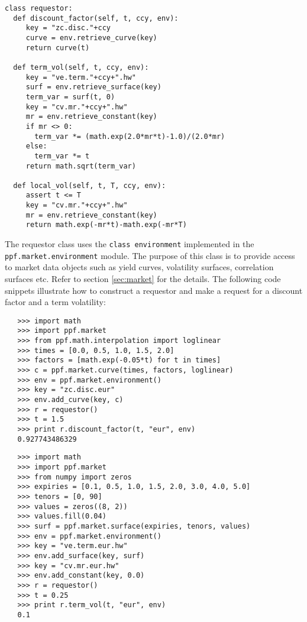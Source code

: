 \begin{verbatim}
class requestor:
  def discount_factor(self, t, ccy, env):
     key = "zc.disc."+ccy
     curve = env.retrieve_curve(key)
     return curve(t)

  def term_vol(self, t, ccy, env):
     key = "ve.term."+ccy+".hw"
     surf = env.retrieve_surface(key)
     term_var = surf(t, 0)
     key = "cv.mr."+ccy+".hw"
     mr = env.retrieve_constant(key)
     if mr <> 0:
       term_var *= (math.exp(2.0*mr*t)-1.0)/(2.0*mr)
     else:
       term_var *= t
     return math.sqrt(term_var)

  def local_vol(self, t, T, ccy, env):
     assert t <= T
     key = "cv.mr."+ccy+".hw"
     mr = env.retrieve_constant(key)
     return math.exp(-mr*t)-math.exp(-mr*T)

\end{verbatim} 

The requestor class uses the \verb|class environment| implemented in
the \\
\verb|ppf.market.environment| module. The purpose of this class is
to provide access to market data objects such as yield curves,
volatility surfaces, correlation surfaces etc. Refer to section
\ref{sec:market} for the details. The following code snippets illustrate
how to construct a requestor and make a request for a discount factor
and a term volatility:

\begin{verbatim}
   >>> import math
   >>> import ppf.market
   >>> from ppf.math.interpolation import loglinear
   >>> times = [0.0, 0.5, 1.0, 1.5, 2.0]
   >>> factors = [math.exp(-0.05*t) for t in times]
   >>> c = ppf.market.curve(times, factors, loglinear)
   >>> env = ppf.market.environment()
   >>> key = "zc.disc.eur"
   >>> env.add_curve(key, c)
   >>> r = requestor()
   >>> t = 1.5
   >>> print r.discount_factor(t, "eur", env)
   0.927743486329
\end{verbatim}

\begin{verbatim}
   >>> import math
   >>> import ppf.market
   >>> from numpy import zeros
   >>> expiries = [0.1, 0.5, 1.0, 1.5, 2.0, 3.0, 4.0, 5.0]
   >>> tenors = [0, 90]
   >>> values = zeros((8, 2))
   >>> values.fill(0.04)
   >>> surf = ppf.market.surface(expiries, tenors, values)
   >>> env = ppf.market.environment()
   >>> key = "ve.term.eur.hw"
   >>> env.add_surface(key, surf)
   >>> key = "cv.mr.eur.hw"
   >>> env.add_constant(key, 0.0)
   >>> r = requestor()
   >>> t = 0.25
   >>> print r.term_vol(t, "eur", env)
   0.1
\end{verbatim}


